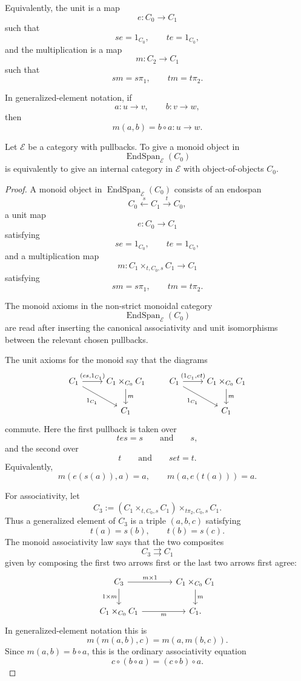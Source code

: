 Equivalently, the unit is a map
\[
e:C_0\to C_1
\]
such that
\[
se=1_{C_0},
\qquad
te=1_{C_0},
\]
and the multiplication is a map
\[
m:C_2\to C_1
\]
such that
\[
sm=s\pi_1,
\qquad
tm=t\pi_2.
\]

In generalized-element notation, if
\[
a:u\to v,
\qquad
b:v\to w,
\]
then
\[
m(a,b)=b\circ a:u\to w.
\]

\begin{theorem}
\label{thm:endospan-monoids-internal-categories}
Let \(\mathcal E\) be a category with pullbacks. To give a monoid object in
\[
\operatorname{EndSpan}_{\mathcal E}(C_0)
\]
is equivalently to give an internal category in \(\mathcal E\) with object-of-objects \(C_0\).
\end{theorem}

\begin{proof}
A monoid object in \(\operatorname{EndSpan}_{\mathcal E}(C_0)\) consists of an endospan
\[
C_0\xleftarrow{s}C_1\xrightarrow{t}C_0,
\]
a unit map
\[
e:C_0\to C_1
\]
satisfying
\[
se=1_{C_0},
\qquad
te=1_{C_0},
\]
and a multiplication map
\[
m:C_1\times_{t,C_0,s}C_1\to C_1
\]
satisfying
\[
sm=s\pi_1,
\qquad
tm=t\pi_2.
\]

The monoid axioms in the non-strict monoidal category
\[
\operatorname{EndSpan}_{\mathcal E}(C_0)
\]
are read after inserting the canonical associativity and unit isomorphisms between the relevant chosen pullbacks.

The unit axioms for the monoid say that the diagrams
\[
\begin{tikzcd}
C_1 \arrow[r, "{(e s,1_{C_1})}"] \arrow[dr, "1_{C_1}"']
&
C_1\times_{C_0}C_1 \arrow[d, "m"]
\\
&
C_1
\end{tikzcd}
\qquad
\begin{tikzcd}
C_1 \arrow[r, "{(1_{C_1},e t)}"] \arrow[dr, "1_{C_1}"']
&
C_1\times_{C_0}C_1 \arrow[d, "m"]
\\
&
C_1
\end{tikzcd}
\]
commute. Here the first pullback is taken over
\[
t e s=s
\qquad\text{and}\qquad
s,
\]
and the second over
\[
t
\qquad\text{and}\qquad
s e t=t.
\]
Equivalently,
\[
m(e(s(a)),a)=a,
\qquad
m(a,e(t(a)))=a.
\]

For associativity, let
\[
C_3
:=
(C_1\times_{t,C_0,s}C_1)
\times_{t\pi_2,C_0,s}
C_1.
\]
Thus a generalized element of \(C_3\) is a triple \((a,b,c)\) satisfying
\[
t(a)=s(b),
\qquad
t(b)=s(c).
\]
The monoid associativity law says that the two composites
\[
C_3\rightrightarrows C_1
\]
given by composing the first two arrows first or the last two arrows first agree:
\[
\begin{tikzcd}[column sep=large]
C_3
\arrow[r, "{m\times 1}"]
\arrow[d, "{1\times m}"']
&
C_1\times_{C_0}C_1
\arrow[d, "m"]
\\
C_1\times_{C_0}C_1
\arrow[r, "m"']
&
C_1.
\end{tikzcd}
\]
In generalized-element notation this is
\[
m(m(a,b),c)=m(a,m(b,c)).
\]
Since \(m(a,b)=b\circ a\), this is the ordinary associativity equation
\[
c\circ(b\circ a)=(c\circ b)\circ a.
\]


\end{proof}
